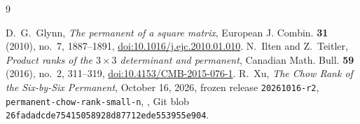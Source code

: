 \documentclass[11pt]{amsart}
\theoremstyle{remark}\newtheorem{remark}[theorem]{Remark}
\numberwithin{equation}{section}
\begin{document}
\begin{thebibliography}{9}
\raggedright
{}
D.~G.~Glynn, \emph{The permanent of a square matrix},
European J. Combin. \textbf{31} (2010), no.~7, 1887--1891,
\href{https://doi.org/10.1016/j.ejc.2010.01.010}{doi:10.1016/j.ejc.2010.01.010}.
N.~Ilten and Z.~Teitler, \emph{Product ranks of the $3\times3$ determinant
and permanent}, Canadian Math. Bull. \textbf{59} (2016), no.~2, 311--319,
\href{https://doi.org/10.4153/CMB-2015-076-1}{doi:10.4153/CMB-2015-076-1}.
R.~Xu, \emph{The Chow Rank of the Six-by-Six Permanent},
October 16, 2026, frozen release \texttt{20261016-r2},
\texttt{permanent-chow-rank-small-n},
, Git blob
\texttt{26fadadcde75415058928d87712ede553955e904}.
\end{thebibliography}
\end{document}
